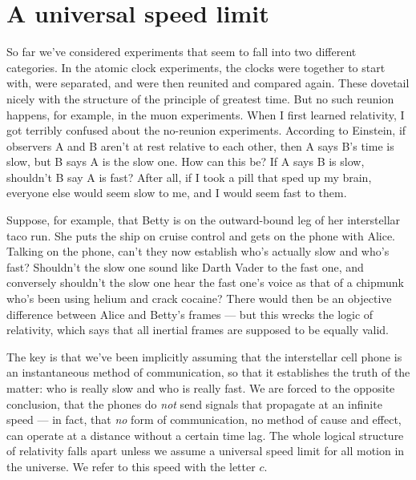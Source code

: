 \section{A universal speed limit}

So far we've considered experiments that seem to fall into two different categories. In the 
atomic clock experiments,
the clocks were together to start with, were separated, and were then reunited and compared again. These
dovetail nicely with the structure of the principle of greatest time. But 
no such reunion happens, for example, in the muon experiments.
When I first learned relativity, I got terribly confused about the no-reunion experiments.
According to Einstein,
      if observers A and B aren't at rest relative to each other, then A says B's time
      is slow, but B says A is the slow one. How can this be? If A says B is slow, shouldn't
      B say A is fast? After all, if I took a pill that sped up my brain, everyone else would
      seem slow to me, and I would seem fast to them.

Suppose, for example, that Betty is on the outward-bound leg of her interstellar taco run. She puts the
ship on cruise control and gets on the phone with Alice. Talking on the phone, can't they now establish
who's actually slow and who's fast? Shouldn't the slow one sound like Darth Vader to the fast one,
and conversely shouldn't the slow one hear the fast one's voice as that of a chipmunk who's been
using helium and crack cocaine? There would then be an objective
difference between Alice and Betty's frames --- but this wrecks the logic of relativity, which
says that all inertial frames are supposed to be equally valid.

The key is that we've been implicitly assuming
that the interstellar cell phone is an instantaneous method of communication, so that it establishes
the truth of the matter: who is really slow and who is really fast. We are forced to the
opposite conclusion, that the phones do \emph{not} send signals that propagate at an infinite speed --- in fact,
that \emph{no} form of communication, no method of cause and effect, can operate at a distance without a
certain time lag. The whole logical structure of relativity falls apart unless we assume 
a universal speed limit for all motion in the universe. We refer to this speed with the letter $c$.




